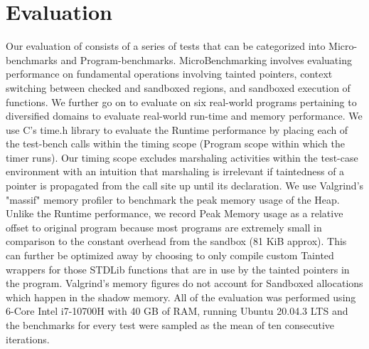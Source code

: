 \section{Evaluation}\label{sec:evaluation}

Our evaluation of \systemname consists of a series of tests that can be categorized into Micro-benchmarks and Program-benchmarks.
MicroBenchmarking involves evaluating performance on fundamental operations involving tainted pointers, context switching between checked and sandboxed regions, and sandboxed execution of functions. We further go on to evaluate \systemname on six real-world programs pertaining to diversified domains to evaluate real-world run-time and memory performance. We use C's \<time.h\> library to evaluate the Runtime performance by placing each of the test-bench calls within the timing scope (Program scope within which the timer runs). Our timing scope excludes marshaling activities within the test-case environment with an intuition that marshaling is irrelevant if tainted\-ness of a pointer is propagated from the call site up until its declaration. We use Valgrind's "massif" memory profiler to benchmark the peak memory usage of the Heap. Unlike the Runtime performance, we record Peak Memory usage as a relative offset to original program because most programs are extremely small in comparison to the constant overhead from the sandbox (81 KiB approx). This can further be optimized away by choosing to only compile custom Tainted wrappers for those STDLib functions that are in use by the tainted pointers in the program. Valgrind's memory figures do not account for Sandboxed allocations which happen in the shadow memory. 
All of the evaluation was performed using 6-Core Intel i7-10700H with 40 GB of RAM, running Ubuntu 20.04.3 LTS and the benchmarks for every test were sampled as the mean of ten consecutive iterations.

